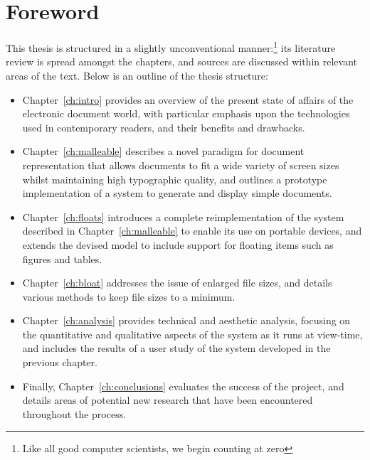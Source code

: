 \cleardoublepage
\chapter{Foreword}
\setcounter{footnote}{-1}
This thesis is structured in a slightly unconventional manner:\footnote{Like all good computer scientists, we begin counting at zero} its literature review is spread amongst the chapters, and sources are discussed within relevant areas of the text. Below is an outline of the thesis structure:

\begin{itemize}
\item Chapter~\ref{ch:intro} provides an overview of the present state of affairs of the electronic document world, with particular emphasis upon the technologies used in contemporary \ebook{} readers, and their benefits and drawbacks.

\item Chapter~\ref{ch:malleable} describes a novel paradigm for document representation that allows documents to fit a wide variety of screen sizes whilst maintaining high typographic quality, and outlines a prototype implementation of a system to generate and display simple documents.

\item Chapter~\ref{ch:floats} introduces a complete reimplementation of the system described in Chapter~\ref{ch:malleable} to enable its use on portable devices, and extends the devised model to include support for floating items such as figures and tables.

\item Chapter~\ref{ch:bloat} addresses the issue of enlarged file sizes, and details various methods to keep file sizes to a minimum.

\item Chapter~\ref{ch:analysis} provides technical and aesthetic analysis, focusing on the quantitative and qualitative aspects of the system as it runs at view-time, and includes the results of a user study of the system developed in the previous chapter.

\item Finally, Chapter~\ref{ch:conclusions} evaluates the success of the project, and details areas of potential new research that have been encountered throughout the process.
\end{itemize}
